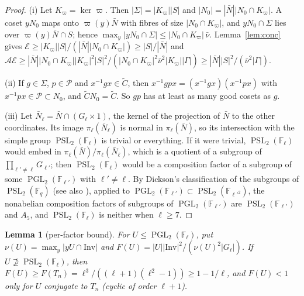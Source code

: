 \documentclass[11pt]{amsart}
\newtheorem{lemma}[theorem]{Lemma}
\theoremstyle{definition}
\theoremstyle{remark}
\newcommand{\F}{\mathbb{F}}
\DeclareMathOperator{\PGL}{PGL}
\DeclareMathOperator{\PSL}{PSL}
\newcommand{\Inv}{\mathrm{Inv}}
\newcommand{\cA}{\mathcal{A}}      %
\newcommand{\cE}{\mathcal{E}}      %
\begin{document}
\begin{proof}
(i) Let $K_\varpi=\ker\varpi$. Then $|\Sigma|=|K_\varpi||S|$ and $|N_0|=|\bar N||N_0\cap K_\varpi|$. A coset $yN_0$ maps onto
$\varpi(y)\bar N$ with fibres of size $|N_0\cap K_\varpi|$, and $yN_0\cap\Sigma$ lies over $\varpi(y)\bar N\cap S$; hence
$\max_y|yN_0\cap\Sigma|\le|N_0\cap K_\varpi|\,\bar\nu$. Lemma~\ref{lem:conc} gives
$\cE\ge|K_\varpi||S|/(|\bar N||N_0\cap K_\varpi|)\ge|S|/|\bar N|$ and
$\cA\cE\ge|\bar N||N_0\cap K_\varpi||K_\varpi|^2|S|^2/(|N_0\cap K_\varpi|^2\bar\nu^2|K_\varpi||\Gamma|)\ge|\bar N||S|^2/(\bar\nu^2|\Gamma|)$.

(ii) If $g\in\Sigma$, $p\in\mathcal P$ and $x^{-1}gx\in\widetilde C$, then $x^{-1}gpx=(x^{-1}gx)(x^{-1}px)$ with
$x^{-1}px\in\mathcal P\subset N_0$, and $\widetilde CN_0=\widetilde C$. So $gp$ has at least as many good cosets as $g$.

(iii) Let $\bar N_\ell=\bar N\cap(G_\ell\times1)$, the kernel of the projection of $\bar N$ to the other coordinates.
Its image $\pi_\ell(\bar N_\ell)$ is normal in $\pi_\ell(\bar N)$, so its intersection with the simple group
$\PSL_2(\F_\ell)$ is trivial or everything. If it were trivial, $\PSL_2(\F_\ell)$ would embed in
$\pi_\ell(\bar N)/\pi_\ell(\bar N_\ell)$, which is a quotient of a subgroup of $\prod_{\ell'\ne\ell}G_{\ell'}$; then
$\PSL_2(\F_\ell)$ would be a composition factor of a subgroup of some $\PGL_2(\F_{\ell'})$ with $\ell'\ne\ell$. By
Dickson's classification of the subgroups of $\PSL_2(\F_q)$ \cite[Part~II, Ch.~XII, \S260]{Dic01} (see also
\cite[Kap.~II, Hauptsatz~8.27]{Hup67}), applied to $\PGL_2(\F_{\ell'})\subset\PSL_2(\F_{\ell'^2})$, the nonabelian
composition factors of subgroups of $\PGL_2(\F_{\ell'})$ are
$\PSL_2(\F_{\ell'})$ and $A_5$, and $\PSL_2(\F_\ell)$ is neither when $\ell\ge7$.
\end{proof}

\begin{lemma}[per-factor bound]\label{lem:factor}
For $U\le\PGL_2(\F_\ell)$, put $\nu(U)=\max_y|yU\cap\Inv|$ and $F(U)=|U||\Inv|^2/(\nu(U)^2|G_\ell|)$. If
$U\not\supseteq\PSL_2(\F_\ell)$, then $F(U)\ge F(T_n)=\ell^3/((\ell+1)(\ell^2-1))\ge1-1/\ell$, and $F(U)<1$ only for
$U$ conjugate to $T_n$ (cyclic of order $\ell+1$).
\end{lemma}
\end{document}
